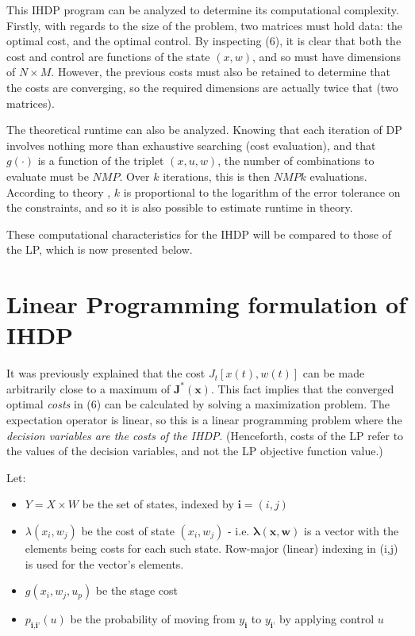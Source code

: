 \documentclass[conference]{IEEEtran}
\begin{document}
This IHDP program can be analyzed to determine its computational complexity. Firstly, with regards to the size of the problem, two matrices must hold data: the optimal cost, and the optimal control. By inspecting (6), it is clear that both the cost and control are functions of the state $(x,w)$, and so must have dimensions of $N\times M$. However, the previous costs must also be retained to determine that the costs are converging, so the required dimensions are actually twice that (two matrices).

The theoretical runtime can also be analyzed. Knowing that each iteration of DP involves nothing more than exhaustive searching (cost evaluation), and that $g(\cdot)$ is a function of the triplet $(x,u,w)$, the number of combinations to evaluate must be $NMP$. Over $k$ iterations, this is then $NMPk$ evaluations. According to theory \cite{bertsekas1995dynamic}, $k$ is proportional to the logarithm of the error tolerance on the constraints, and so it is also possible to estimate runtime in theory.

These computational characteristics for the IHDP will be compared to those of the LP, which is now presented below.


\section{Linear Programming formulation of IHDP}
It was previously explained that the cost $J_{t}[x(t),w(t)]$ can be made arbitrarily close to a maximum of $\boldsymbol{J^{*}(x)}$. This fact implies that the converged optimal \textit{costs} in (6) can be calculated by solving a maximization problem. The expectation operator is linear, so this is a linear programming problem where the \textit{decision variables are the costs of the IHDP}. (Henceforth, costs of the LP refer to the values of the decision variables, and not the LP objective function value.)

Let:
\begin{itemize}
	\item $Y = X\times W$ be the set of states, indexed by $\textbf{i}=(i,j)$
	\item $\lambda(x_{i},w_{j})$ be the cost of state $(x_{i},w_{j})$ - i.e. $\boldsymbol{\lambda(x,w)}$ is a vector with the elements being costs for each such state. Row-major (linear) indexing in (i,j) is used for the vector's elements.
	\item $g(x_{i},w_{j},u_{p})$ be the stage cost
	\item $p_{\textbf{i},\textbf{i'}}(u)$ be the probability of moving from $y_{\textbf{i}}$ to $y_{\textbf{i'}}$ by applying control $u$
\end{itemize}
\end{document}
